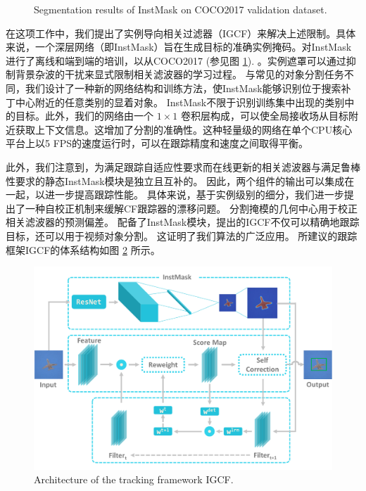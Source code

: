 \begin{figure}
                       \hspace{-0.6em}
    \caption{Segmentation results of InstMask on COCO2017 \cite{COCO} validation dataset.}
    \label{fig:InstMask}
\end{figure}

在这项工作中，我们提出了实例导向相关过滤器（IGCF）来解决上述限制。具体来说，一个深层网络（即InstMask）旨在生成目标的准确实例掩码。对InstMask进行了离线和端到端的培训，以从COCO2017 \cite{COCO} (参见图 \ref{fig:InstMask}). 。实例遮罩可以通过抑制背景杂波的干扰来显式限制相关滤波器的学习过程。
与常见的对象分割任务不同，我们设计了一种新的网络结构和训练方法，使InstMask能够识别位于搜索补丁中心附近的任意类别的显着对象。 InstMask不限于识别训练集中出现的类别中的目标。此外，我们的网络由一个 $1 \times 1$ 卷积层构成，可以使全局接收场从目标附近获取上下文信息。这增加了分割的准确性。这种轻量级的网络在单个CPU核心平台上以5 FPS的速度运行时，可以在跟踪精度和速度之间取得平衡。

此外，我们注意到，为满足跟踪自适应性要求而在线更新的相关滤波器与满足鲁棒性要求的静态InstMask模块是独立且互补的。 因此，两个组件的输出可以集成在一起，以进一步提高跟踪性能。 具体来说，基于实例级别的细分，我们进一步提出了一种自校正机制来缓解CF跟踪器的漂移问题。 分割掩模的几何中心用于校正相关滤波器的预测偏差。 配备了InstMask模块，提出的IGCF不仅可以精确地跟踪目标，还可以用于视频对象分割。 这证明了我们算法的广泛应用。 所建议的跟踪框架IGCF的体系结构如图 \ref{fig:IGCF} 所示。

\begin{figure}
    \centering
    \includegraphics[width=1.0\textwidth]{Img/IGCF/instmask1.pdf}
    \caption{Architecture of the tracking framework IGCF.}
    \label{fig:IGCF}
\end{figure}

